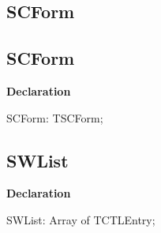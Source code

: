 \documentclass{report}
\newif\ifpdf
\begin{document}
\subsection*{\large{\textbf{SCForm}}\normalsize\hspace{1ex}\hrulefill}
\else
\subsection*{SCForm}
\fi
\label{swcatalog-SCForm}
\begin{list}{}{
\setlength{\itemindent}{0cm}
\setlength{\listparindent}{0cm}
\setlength{\leftmargin}{\evensidemargin}
\addtolength{\leftmargin}{\tmplength}
\settowidth{\labelsep}{X}
\addtolength{\leftmargin}{\labelsep}
\setlength{\labelwidth}{\tmplength}
}
\item[\textbf{Declaration}\hfill]
\ifpdf
\begin{flushleft}
\fi
\begin{ttfamily}
SCForm: TSCForm;\end{ttfamily}

\ifpdf
\end{flushleft}
\fi

\end{list}
\ifpdf
\subsection*{\large{\textbf{SWList}}\normalsize\hspace{1ex}\hrulefill}
\else
\subsection*{SWList}
\fi
\label{swcatalog-SWList}
\begin{list}{}{
\setlength{\itemindent}{0cm}
\setlength{\listparindent}{0cm}
\setlength{\leftmargin}{\evensidemargin}
\addtolength{\leftmargin}{\tmplength}
\settowidth{\labelsep}{X}
\addtolength{\leftmargin}{\labelsep}
\setlength{\labelwidth}{\tmplength}
}
\item[\textbf{Declaration}\hfill]
\ifpdf
\begin{flushleft}
\fi
\begin{ttfamily}
SWList: Array of TCTLEntry;\end{ttfamily}

\ifpdf
\end{flushleft}
\fi

\end{list}
\ifpdf
\end{document}
